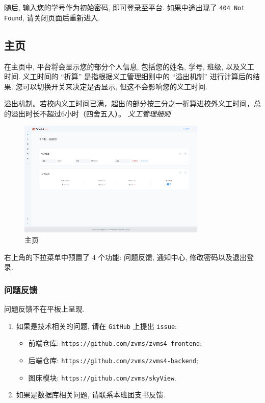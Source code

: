 \documentclass{article}
\begin{document}
随后, 输入您的学号作为初始密码, 即可登录至平台. 如果中途出现了 \texttt{404 Not Found}, 请关闭页面后重新进入.

\subsection{主页}

在主页中, 平台将会显示您的部分个人信息, 包括您的姓名, 学号, 班级, 以及义工时间. 义工时间的 ``折算'' 是指根据义工管理细则中的 ``溢出机制'' 进行计算后的结果. 您可以切换开关来决定是否显示, 但这不会影响您的义工时间.

\begin{mdframed}
  \fangsong
  溢出机制。若校内义工时间已满，超出的部分按三分之一折算进校外义工时间，总的溢出时长不超过6小时（四舍五入）。
  \hfill \textit{义工管理细则}
\end{mdframed}

\begin{figure}[H]
  \centering
  \includegraphics[width=0.8\textwidth]{../assets/image-20240303152245767.png}
  \caption{主页}
  \label{fig:home}
\end{figure}

右上角的下拉菜单中预置了 4 个功能: 问题反馈, 通知中心, 修改密码以及退出登录.

\subsubsection{问题反馈}

问题反馈不在平板上呈现.

\begin{enumerate}
  \item 如果是技术相关的问题, 请在 \texttt{GitHub} 上提出 \texttt{issue}:
  \begin{itemize}
    \item 前端仓库: \texttt{https://github.com/zvms/zvms4-frontend};
    \item 后端仓库: \texttt{https://github.com/zvms/zvms4-backend};
    \item 图床模块: \texttt{https://github.com/zvms/skyView}.
  \end{itemize}
  \item 如果是数据库相关问题, 请联系本班团支书反馈.
\end{enumerate}
\end{document}

